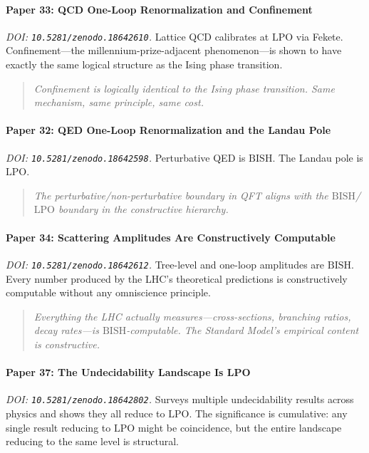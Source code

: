 \documentclass[11pt,a4paper]{report}
\theoremstyle{plain}
\theoremstyle{definition}
\theoremstyle{remark}
\newcommand{\BISH}{\mathrm{BISH}}
\newcommand{\LPO}{\mathrm{LPO}}
\begin{document}
\paragraph{Paper 33: QCD One-Loop Renormalization and Confinement}
\emph{DOI: \texttt{10.5281/zenodo.18642610}.}\quad
Lattice QCD calibrates at $\LPO$ via Fekete.  Confinement---the millennium-prize-adjacent phenomenon---is shown to have exactly the same logical structure as the Ising phase transition.
\begin{quote}\itshape
Confinement is logically identical to the Ising phase transition.  Same mechanism, same principle, same cost.
\end{quote}

\paragraph{Paper 32: QED One-Loop Renormalization and the Landau Pole}
\emph{DOI: \texttt{10.5281/zenodo.18642598}.}\quad
Perturbative QED is $\BISH$.  The Landau pole is $\LPO$.
\begin{quote}\itshape
The perturbative/non-perturbative boundary in QFT aligns with the $\BISH$/$\LPO$ boundary in the constructive hierarchy.
\end{quote}

\paragraph{Paper 34: Scattering Amplitudes Are Constructively Computable}
\emph{DOI: \texttt{10.5281/zenodo.18642612}.}\quad
Tree-level and one-loop amplitudes are $\BISH$.  Every number produced by the LHC's theoretical predictions is constructively computable without any omniscience principle.
\begin{quote}\itshape
Everything the LHC actually measures---cross-sections, branching ratios, decay rates---is $\BISH$-computable.  The Standard Model's empirical content is constructive.
\end{quote}

\paragraph{Paper 37: The Undecidability Landscape Is LPO}
\emph{DOI: \texttt{10.5281/zenodo.18642802}.}\quad
Surveys multiple undecidability results across physics and shows they all reduce to $\LPO$.  The significance is cumulative: any single result reducing to $\LPO$ might be coincidence, but the entire landscape reducing to the same level is structural.
\end{document}

